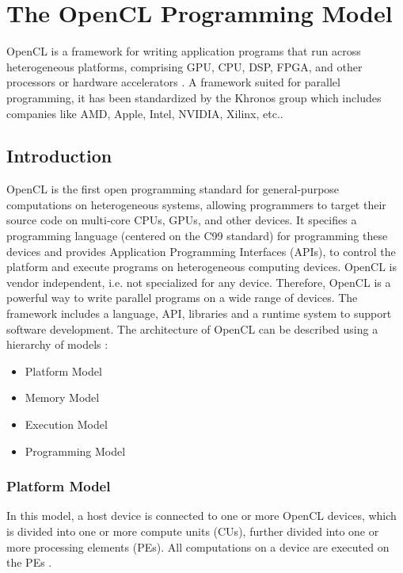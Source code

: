 \chapter{The OpenCL Programming Model}
\label{ch4_opencl}

OpenCL is a framework for writing application programs that run across heterogeneous platforms, comprising \ac{GPU}, \ac{CPU}, \ac{DSP}, \ac{FPGA}, and other processors or hardware accelerators \cite{opencl_wiki}. A framework suited for parallel programming, it has been standardized by the Khronos group which includes companies like AMD, Apple, Intel, NVIDIA, Xilinx, etc.\cite{opencl_fixstars}.

\section{Introduction}
\label{sect4_1}

OpenCL is the first open programming standard for general-purpose computations on heterogeneous systems, allowing programmers to target their source code on multi-core CPUs, GPUs, and other devices. It specifies a programming language (centered on the C99 standard) for programming these devices and provides Application Programming Interfaces (APIs), to control the platform and execute programs on heterogeneous computing devices. OpenCL is vendor independent, i.e. not specialized for any device. Therefore, OpenCL is a powerful way to write parallel programs on a wide range of devices. \newline\newline
The framework includes a language, API, libraries and a runtime system to support software development. The architecture of OpenCL can be described using a hierarchy of models \cite{opencl_ajg}:

\begin{itemize}
\item Platform Model
\item Memory Model
\item Execution Model
\item Programming Model
\end{itemize}

\subsection{Platform Model}
\label{sect4_1_1}
In this model, a host device is connected to one or more OpenCL devices, which is divided into one or more compute units (CUs), further divided into one or more processing elements (PEs). All computations on a device are executed on the PEs \cite{opencl_khronos}.

